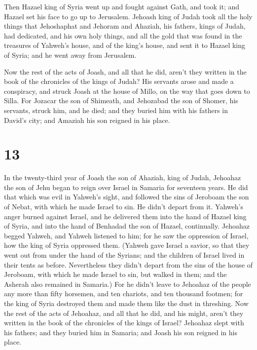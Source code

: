  Then Hazael king of Syria went up and fought against
Gath, and took it; and Hazael set his face to go up to Jerusalem.
 Jehoash king of Judah took all the holy things that
Jehoshaphat and Jehoram and Ahaziah, his fathers, kings of Judah, had
dedicated, and his own holy things, and all the gold that was found in
the treasures of Yahweh's house, and of the king's house, and sent it to
Hazael king of Syria; and he went away from Jerusalem.

 Now the rest of the acts of Joash, and all that he did,
aren't they written in the book of the chronicles of the kings of Judah?
 His servants arose and made a conspiracy, and struck
Joash at the house of Millo, on the way that goes down to Silla.
 For Jozacar the son of Shimeath, and Jehozabad the son
of Shomer, his servants, struck him, and he died; and they buried him
with his fathers in David's city; and Amaziah his son reigned in his
place.

\hypertarget{section-12}{%
\section{13}\label{section-12}}

 In the twenty-third year of Joash the son of Ahaziah,
king of Judah, Jehoahaz the son of Jehu began to reign over Israel in
Samaria for seventeen years.  He did that which was evil
in Yahweh's sight, and followed the sins of Jeroboam the son of Nebat,
with which he made Israel to sin. He didn't depart from it.
 Yahweh's anger burned against Israel, and he delivered
them into the hand of Hazael king of Syria, and into the hand of
Benhadad the son of Hazael, continually.  Jehoahaz begged
Yahweh, and Yahweh listened to him; for he saw the oppression of Israel,
how the king of Syria oppressed them.  (Yahweh gave Israel
a savior, so that they went out from under the hand of the Syrians; and
the children of Israel lived in their tents as before. 
Nevertheless they didn't depart from the sins of the house of Jeroboam,
with which he made Israel to sin, but walked in them; and the Asherah
also remained in Samaria.)  For he didn't leave to
Jehoahaz of the people any more than fifty horsemen, and ten chariots,
and ten thousand footmen; for the king of Syria destroyed them and made
them like the dust in threshing.  Now the rest of the acts
of Jehoahaz, and all that he did, and his might, aren't they written in
the book of the chronicles of the kings of Israel? 
Jehoahaz slept with his fathers; and they buried him in Samaria; and
Joash his son reigned in his place.

